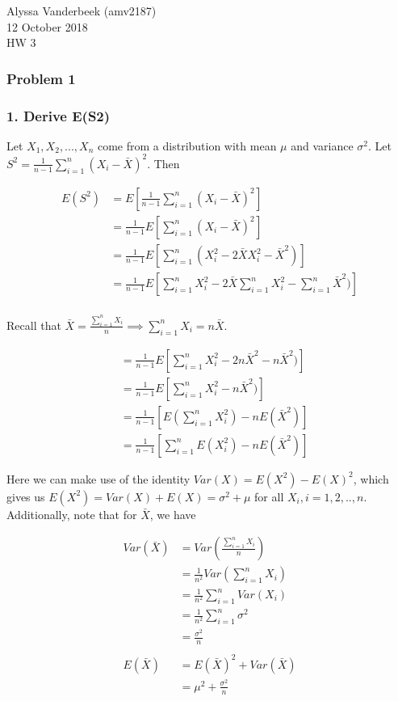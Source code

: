 \documentclass[]{article}
\title{}
\author{}
\date{}
\begin{document}
Alyssa Vanderbeek (amv2187)\\
12 October 2018\\
HW 3

\subsubsection{Problem 1}\label{problem-1}

\subsubsection{1. Derive E(S2)}\label{derive-es2}

Let \(X_1, X_2, ..., X_n\) come from a distribution with mean \(\mu\)
and variance \(\sigma^2\). Let
\(S^2 = \frac{1}{n-1}\sum_{i=1}^n (X_i-\bar{X})^2\). Then

\[
\begin{aligned}
E(S^2) &= E[\frac{1}{n-1}\sum_{i=1}^n (X_i-\bar{X})^2] \\
&= \frac{1}{n-1}E[\sum_{i=1}^n (X_i-\bar{X})^2] \\
&= \frac{1}{n-1}E[\sum_{i=1}^n (X_i^2 - 2\bar{X}X_i^2-\bar{X}^2)] \\
&= \frac{1}{n-1}E[\sum_{i=1}^n X_i^2 - 2\bar{X} \sum_{i=1}^n X_i^2 - \sum_{i=1}^n \bar{X}^2)] \\
\end{aligned}
\]

Recall that
\(\bar{X} = \frac{\sum_{i=1}^n X_i}{n} \implies \sum_{i=1}^n X_i = n\bar{X}\).

\[
\begin{aligned}
&= \frac{1}{n-1}E[\sum_{i=1}^n X_i^2 - 2n\bar{X}^2 - n\bar{X}^2)] \\
&= \frac{1}{n-1}E[\sum_{i=1}^n X_i^2 - n\bar{X}^2)] \\
&= \frac{1}{n-1}[E(\sum_{i=1}^n X_i^2) - nE(\bar{X}^2)] \\
&= \frac{1}{n-1}[\sum_{i=1}^n E(X_i^2) - nE(\bar{X}^2)]
\end{aligned}
\]

Here we can make use of the identity \(Var(X) = E(X^2) - E(X)^2\), which
gives us \(E(X^2) = Var(X) + E(X) = \sigma^2 + \mu\) for all
\(X_i, i=1,2,..,n\). Additionally, note that for \(\bar{X}\), we have

\[
\begin{aligned}
Var(\bar{X}) &= Var(\frac{\sum_{i=1}^n X_i}{n}) \\
&= \frac{1}{n^2} Var(\sum_{i=1}^n X_i) \\
&= \frac{1}{n^2} \sum_{i=1}^n Var(X_i) \\
&= \frac{1}{n^2} \sum_{i=1}^n \sigma^2 \\
&= \frac{\sigma^2}{n} \\
\\
E(\bar{X}) &= E(\bar{X})^2 + Var(\bar{X}) \\
&= \mu^2 + \frac{\sigma^2}{n}
\end{aligned}
\]
\end{document}

